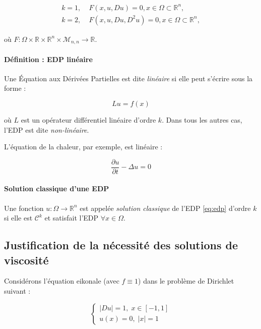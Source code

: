 \documentclass[12pt,a4paper,twoside]{article}
\begin{document}
\begin{align}  
k=1, & \; F(x,u,Du) = 0, x\in \Omega \subset \mathbb{R}^n, \label{eq:edp}\\
k=2, & \;  F(x,u,Du,D^2u) = 0, x\in \Omega \subset \mathbb{R}^n, \label{eq:edp2}
\end{align}

où $F : \Omega \times \mathbb{R} \times \mathbb{R}^n \times \mathcal{M}_{n,n} \to \mathbb{R}$.

\paragraph*{Définition : EDP linéaire}

Une Équation aux Dérivées Partielles est dite \emph{linéaire} si elle peut s'écrire sous la forme :

$$ Lu = f(x) $$

où $L$ est un opérateur différentiel linéaire d'ordre $k$. Dans tous les autres cas, l'EDP est dite \emph{non-linéaire}.

L'équation de la chaleur, par exemple, est linéaire :

\begin{equation}
\frac{\partial u}{\partial t} - \Delta u = 0
\end{equation}


\paragraph*{Solution classique d'une EDP}

Une fonction $u : \Omega \to \mathbb{R}^n$ est appelée \emph{solution classique} de l'EDP \ref{eq:edp} d'ordre $k$ si elle est $\mathcal{C}^k$ et satisfait l'EDP $\forall x \in \Omega$.


\subsection{Justification de la nécessité des solutions de viscosité}


Considérons l'équation eikonale (avec $f \equiv 1$) dans le problème de Dirichlet suivant :

\begin{equation} \label{eq:eikonal}
    \begin{cases}
        |Du| = 1, \; x \in [-1, 1] \\
        u(x) = 0, \;  |x| = 1
    \end{cases}
\end{equation}
\end{document}
